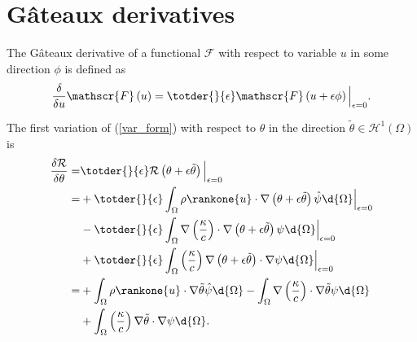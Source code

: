 \section{G\^{a}teaux derivatives}

The G\^{a}teaux derivative of a functional $\mathscr{F}$ with respect to variable $u$ in some direction $\phi$ is defined as 
\begin{align*}
 \frac{\delta}{\delta u} \mathscr{F}\left( u \right) = \totder{}{\epsilon} \mathscr{F} \left(u + \epsilon \phi \right) \Big|_{\epsilon = 0}.
\end{align*} 

The first variation of (\ref{var_form}) with respect to $\theta$ in the direction $\tilde{\theta} \in \mathcal{H}^1(\Omega)$ is
\begin{align}
  \frac{\delta \mathcal{R}}{\delta \theta} = &\totder{}{\epsilon} \mathcal{R} \left(\theta + \epsilon \tilde{\theta} \right) \Big|_{\epsilon = 0} \notag \\
  = &+ \totder{}{\epsilon} \int_{\Omega} \rho \rankone{u} \cdot \nabla \left( \theta + \epsilon \tilde{\theta} \right) \hat{\psi} \d{\Omega} \Big|_{\epsilon = 0} \notag \\
    &- \totder{}{\epsilon} \int_{\Omega} \nabla \left( \frac{\kappa}{c} \right) \cdot \nabla \left( \theta + \epsilon \tilde{\theta} \right) \psi \d{\Omega} \Big|_{\epsilon = 0} \notag \\
    &+ \totder{}{\epsilon} \int_{\Omega} \left( \frac{\kappa}{c} \right) \nabla \left( \theta + \epsilon \tilde{\theta} \right) \cdot \nabla \psi \d{\Omega} \Big|_{\epsilon = 0} \notag \\
  = &+ \int_{\Omega} \rho \rankone{u} \cdot \nabla \tilde{\theta} \hat{\psi} \d{\Omega} - \int_{\Omega} \nabla \left( \frac{\kappa}{c} \right) \cdot \nabla \tilde{\theta} \psi \d{\Omega} \notag \\
    &+ \int_{\Omega} \left( \frac{\kappa}{c} \right) \nabla \tilde{\theta} \cdot \nabla \psi \d{\Omega}. \notag
\end{align}

